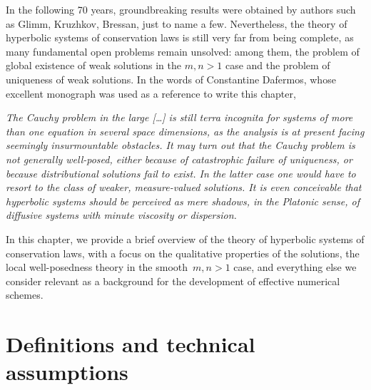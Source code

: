 In the following 70 years, groundbreaking results were obtained
by authors such as Glimm, Kruzhkov, Bressan, just to name a few.
Nevertheless, the theory of hyperbolic systems of conservation laws is still
very far from being complete, as many fundamental open problems remain
unsolved: among them, the problem of global existence of weak
solutions in the $m,n > 1$ case and the problem of uniqueness of weak solutions.
In the words of Constantine Dafermos, whose excellent monograph \cite{dafermos}
was used as a reference to write this chapter,
\begin{displayquote}
\textit{The Cauchy problem in the large [\dots]
is still terra incognita for systems of more
than one equation in several space dimensions, as the analysis is at
present facing seemingly insurmountable obstacles. It may turn out that
the Cauchy problem is not generally well-posed, either because of
catastrophic failure of uniqueness, or because distributional solutions
fail to exist. In the latter case one would have to resort to the class
of weaker, measure-valued solutions. It is even conceivable that
hyperbolic systems should be perceived as mere shadows, in the Platonic sense,
of diffusive systems with minute viscosity or dispersion.}
\end{displayquote}
In this chapter, we provide a brief overview of the theory of hyperbolic
systems of conservation laws, with a focus on the qualitative properties
of the solutions, the local well-posedness theory in the smooth~$m,n > 1$ case,
and everything else we consider relevant as a background for the development
of effective numerical schemes.

\section{Definitions and technical assumptions}

